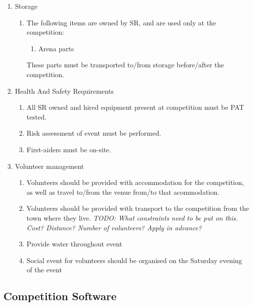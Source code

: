 \begin{enumerate}
\begin{enumerate}
  \item Storage
    \begin{enumerate}
    \item The following items are owned by SR, and are used only at the competition:
      \begin{enumerate}
      \item Arena parts
      \end{enumerate}
      These parts must be transported to/from storage before/after the competition.
    \end{enumerate}


\item Health And Safety Requirements

  \begin{enumerate}
  \item All SR owned and hired equipment present at competition must be PAT tested.
  \item Risk assessment of event must be performed.
  \item First-aiders must be on-site.
  \end{enumerate}


\item Volunteer management
  \begin{enumerate}
  \item Volunteers should be provided with accommodation for the competition, as well as travel to/from the venue from/to that acommodation.
  \item Volunteers should be provided with transport to the competition from the town where they live. \textit{TODO: What constraints need to be put on this.  Cost?  Distance?  Number of volunteers?  Apply in advance?}

  \item Provide water throughout event
  \item Social event for volunteers should be organised on the Saturday evening of the event

  \end{enumerate}

  \end{enumerate}
\end{enumerate}


\subsection{Competition Software}

